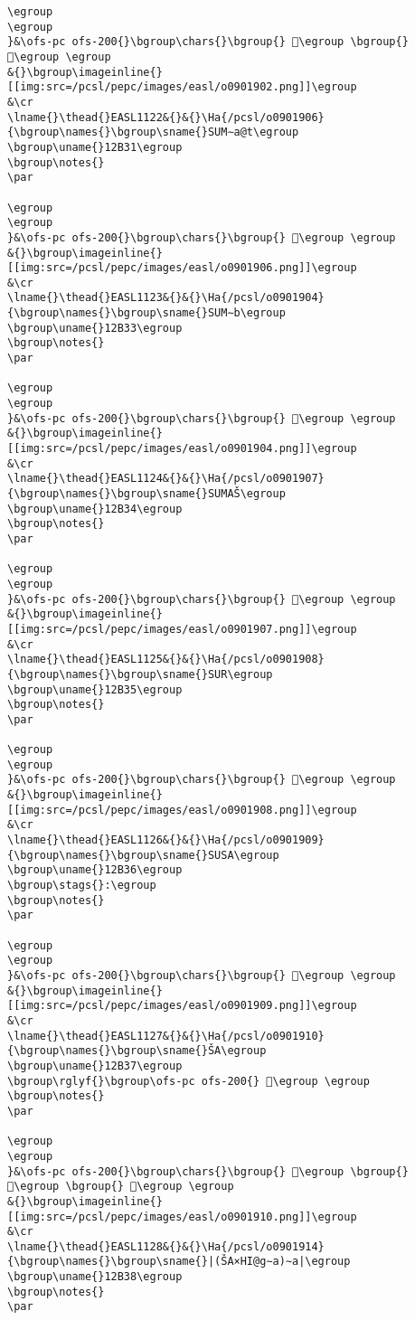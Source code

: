 \begin{verbatim}
\egroup
\egroup
}&\ofs-pc ofs-200{}\bgroup\chars{}\bgroup{} 𒬰\egroup \bgroup{} 𒬲\egroup \egroup
&{}\bgroup\imageinline{}[[img:src=/pcsl/pepc/images/easl/o0901902.png]]\egroup
&\cr
\lname{}\thead{}EASL1122&{}&{}\Ha{/pcsl/o0901906}{\bgroup\names{}\bgroup\sname{}SUM∼a@t\egroup
\bgroup\uname{}12B31\egroup
\bgroup\notes{}
\par 

\egroup
\egroup
}&\ofs-pc ofs-200{}\bgroup\chars{}\bgroup{} 𒬱\egroup \egroup
&{}\bgroup\imageinline{}[[img:src=/pcsl/pepc/images/easl/o0901906.png]]\egroup
&\cr
\lname{}\thead{}EASL1123&{}&{}\Ha{/pcsl/o0901904}{\bgroup\names{}\bgroup\sname{}SUM∼b\egroup
\bgroup\uname{}12B33\egroup
\bgroup\notes{}
\par 

\egroup
\egroup
}&\ofs-pc ofs-200{}\bgroup\chars{}\bgroup{} 𒬳\egroup \egroup
&{}\bgroup\imageinline{}[[img:src=/pcsl/pepc/images/easl/o0901904.png]]\egroup
&\cr
\lname{}\thead{}EASL1124&{}&{}\Ha{/pcsl/o0901907}{\bgroup\names{}\bgroup\sname{}SUMAŠ\egroup
\bgroup\uname{}12B34\egroup
\bgroup\notes{}
\par 

\egroup
\egroup
}&\ofs-pc ofs-200{}\bgroup\chars{}\bgroup{} 𒬴\egroup \egroup
&{}\bgroup\imageinline{}[[img:src=/pcsl/pepc/images/easl/o0901907.png]]\egroup
&\cr
\lname{}\thead{}EASL1125&{}&{}\Ha{/pcsl/o0901908}{\bgroup\names{}\bgroup\sname{}SUR\egroup
\bgroup\uname{}12B35\egroup
\bgroup\notes{}
\par 

\egroup
\egroup
}&\ofs-pc ofs-200{}\bgroup\chars{}\bgroup{} 𒬵\egroup \egroup
&{}\bgroup\imageinline{}[[img:src=/pcsl/pepc/images/easl/o0901908.png]]\egroup
&\cr
\lname{}\thead{}EASL1126&{}&{}\Ha{/pcsl/o0901909}{\bgroup\names{}\bgroup\sname{}SUSA\egroup
\bgroup\uname{}12B36\egroup
\bgroup\stags{}:\egroup
\bgroup\notes{}
\par 

\egroup
\egroup
}&\ofs-pc ofs-200{}\bgroup\chars{}\bgroup{} 𒬶\egroup \egroup
&{}\bgroup\imageinline{}[[img:src=/pcsl/pepc/images/easl/o0901909.png]]\egroup
&\cr
\lname{}\thead{}EASL1127&{}&{}\Ha{/pcsl/o0901910}{\bgroup\names{}\bgroup\sname{}ŠA\egroup
\bgroup\uname{}12B37\egroup
\bgroup\rglyf{}\bgroup\ofs-pc ofs-200{} 𒬷\egroup \egroup
\bgroup\notes{}
\par 

\egroup
\egroup
}&\ofs-pc ofs-200{}\bgroup\chars{}\bgroup{} 𒬻\egroup \bgroup{} 𒬼\egroup \bgroup{} 𒬷\egroup \egroup
&{}\bgroup\imageinline{}[[img:src=/pcsl/pepc/images/easl/o0901910.png]]\egroup
&\cr
\lname{}\thead{}EASL1128&{}&{}\Ha{/pcsl/o0901914}{\bgroup\names{}\bgroup\sname{}|(ŠA×HI@g∼a)∼a|\egroup
\bgroup\uname{}12B38\egroup
\bgroup\notes{}
\par 


\end{verbatim}

